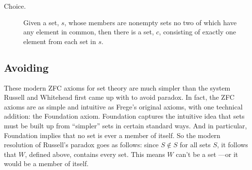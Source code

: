 \begin{description}
\iffalse  %
For every non-empty set, $x$, there is a set $y \in x$
  such that $x$ and $y$ have no elements in common.  
\fi

\item[Choice.]  Given a set, $s$, whose members are nonempty sets no two
  of which have any element in common, then there is a set, $c$,
  consisting of exactly one element from each set in $s$.

\iffalse
\begin{tabbing}
$\exists y \, \forall z \, \forall w \,
 \biggl( ($\=$z \in w \,\QAND\, w \in x) \; \QIMPLIES $\\
\> $\exists v \, \exists u \, \Bigl(\exists t \, \bigr((u \in w \, \QAND \, w \in t)$\=$\;\QAND\; (u \in t \,\QAND\, t \in y)\bigl) $\\
\> \> $\QIFF\; u = v\Bigr) \biggr)$
\end{tabbing}

\[\begin{array}{rlll}
\exists y \forall z \forall w & ( (z \in w \QAND w \in x) \QIMPLIES\\
                              &\quad \exists v \exists u (\exists t
                                           ((u \in w \QAND & w \in t)
                                                              & \QAND (u \in t \QAND t \in y))\\
                                                            &&& \QIFF u = v))
\end{array}\]
\fi

\end{description}


\subsection{Avoiding }

These modern ZFC axioms for set theory are much simpler than the system
Russell and Whitehead first came up with to avoid paradox.  In fact, the
ZFC axioms are as simple and intuitive as Frege's original axioms, with
one technical addition: the Foundation axiom.  Foundation captures the
intuitive idea that sets must be built up from ``simpler'' sets in certain
standard ways.  And in particular, Foundation implies that no set is ever
a member of itself.  So the modern resolution of Russell's paradox goes as
follows: since $S \not \in S$ for all sets $S$, it follows that $W$,
defined above, contains every set.  This means $W$ can't be a set ---or it
would be a member of itself.

